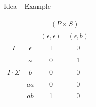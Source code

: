 \documentclass{beamer}
\begin{document}

\begin{frame}{Idea -- Example}
\begin{center}
    \begin{tabular}{|cc|c|c|} 
        \multicolumn{2}{c|}{} & \multicolumn{2}{c|}{$(P\times S)$} \\
        \multicolumn{2}{c|}{} & $(\epsilon,\epsilon)$ & $(\epsilon,b)$ \\ \hline
        $I$ & $\epsilon$ & 1 & 0 \\ 
            & $a$ & 0 & 1 \\\hline
        $I \cdot \Sigma$ & $b$ & 0 & 0 \\
            & $aa$ & 0 & 0 \\ 
            & $ab$ & 1 & 0 \\ \hline
    \end{tabular}
\end{center}
\end{frame}
\end{document}
